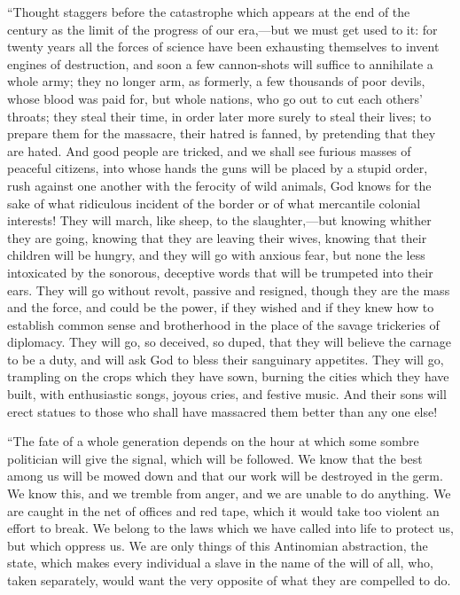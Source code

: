 \documentclass{book}
\begin{document}
“Thought staggers before the catastrophe which appears at the end of the century as the limit of the progress of our era,—but we must get used to it: for twenty years all the forces of science have been exhausting themselves to invent engines of destruction, and soon a few cannon-shots will suffice to annihilate a whole army; they no longer arm, as formerly, a few thousands of poor devils, whose blood was paid for, but whole nations, who go out to cut each others’ throats; they steal their time, in order later more surely to steal their lives; to prepare them for the massacre, their hatred is fanned, by pretending that they are hated. And good people are tricked, and we shall see furious masses of peaceful citizens, into whose hands the guns will be placed by a stupid order, rush against one another with the ferocity of wild animals, God knows for the sake of what ridiculous incident of the border or of what mercantile colonial interests! They will march, like sheep, to the slaughter,—but knowing whither they are going, knowing that they are leaving their wives, knowing that their children will be hungry, and they will go with anxious fear, but none the less intoxicated by the sonorous, deceptive words that will be trumpeted into their ears. They will go without revolt, passive and resigned, though they are the mass and the force, and could be the power, if they wished and if they knew how to establish common sense and brotherhood in the place of the savage trickeries of diplomacy. They will go, so deceived, so duped, that they will believe the carnage to be a duty, and will ask God to bless their sanguinary appetites. They will go, trampling on the crops which they have sown, burning the cities which they have built, with enthusiastic songs, joyous cries, and festive music. And their sons will erect statues to those who shall have massacred them better than any one else!

“The fate of a whole generation depends on the hour at which some sombre politician will give the signal, which will be followed. We know that the best among us will be mowed down and that our work will be destroyed in the germ. We know this, and we tremble from anger, and we are unable to do anything. We are caught in the net of offices and red tape, which it would take too violent an effort to break. We belong to the laws which we have called into life to protect us, but which oppress us. We are only things of this Antinomian abstraction, the state, which makes every individual a slave in the name of the will of all, who, taken separately, would want the very opposite of what they are compelled to do.
\end{document}
